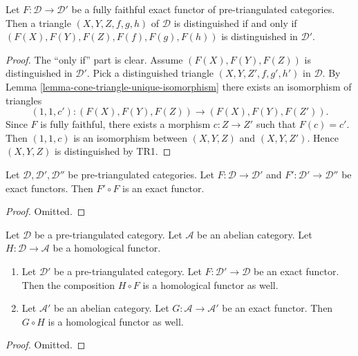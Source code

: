 \begin{lemma}
\label{lemma-exact-equivalence}
Let $F : \mathcal{D} \to \mathcal{D}'$ be a fully faithful exact functor
of pre-triangulated categories. Then a triangle $(X, Y, Z, f, g, h)$
of $\mathcal{D}$ is distinguished if and only if
$(F(X), F(Y), F(Z), F(f), F(g), F(h))$ is distinguished in $\mathcal{D}'$.
\end{lemma}

\begin{proof}
The ``only if'' part is clear. Assume $(F(X), F(Y), F(Z))$ is
distinguished in $\mathcal{D}'$. Pick a distinguished triangle
$(X, Y, Z', f, g', h')$ in $\mathcal{D}$. By
Lemma \ref{lemma-cone-triangle-unique-isomorphism}
there exists an isomorphism of triangles
$$
(1, 1, c') : (F(X), F(Y), F(Z)) \longrightarrow (F(X), F(Y), F(Z')).
$$
Since $F$ is fully faithful, there exists a morphism $c : Z \to Z'$
such that $F(c) = c'$. Then $(1, 1, c)$ is an isomorphism between
$(X, Y, Z)$ and $(X, Y, Z')$. Hence $(X, Y, Z)$ is distinguished
by TR1.
\end{proof}

\begin{lemma}
\label{lemma-composition-exact}
Let $\mathcal{D}, \mathcal{D}', \mathcal{D}''$ be pre-triangulated categories.
Let $F : \mathcal{D} \to \mathcal{D}'$ and
$F' : \mathcal{D}' \to \mathcal{D}''$ be exact functors.
Then $F' \circ F$ is an exact functor.
\end{lemma}

\begin{proof}
Omitted.
\end{proof}

\begin{lemma}
\label{lemma-exact-compose-homological-functor}
Let $\mathcal{D}$ be a pre-triangulated category.
Let $\mathcal{A}$ be an abelian category.
Let $H : \mathcal{D} \to \mathcal{A}$ be a homological functor.
\begin{enumerate}
\item Let $\mathcal{D}'$ be a pre-triangulated category.
Let $F : \mathcal{D}' \to \mathcal{D}$ be an exact functor.
Then the composition $H \circ F$ is a homological functor as well.
\item Let $\mathcal{A}'$ be an abelian category. Let
$G : \mathcal{A} \to \mathcal{A}'$ be an exact functor.
Then $G \circ H$ is a homological functor as well.
\end{enumerate}
\end{lemma}

\begin{proof}
Omitted.
\end{proof}

